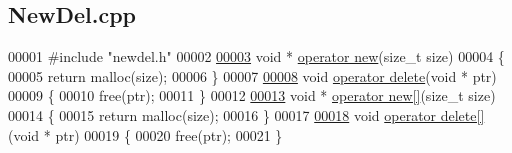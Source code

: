 \hypertarget{_new_del_8cpp_source}{
\subsection{NewDel.cpp}
}

\begin{DoxyCode}
00001 \textcolor{preprocessor}{#include "newdel.h"}
00002 
\hypertarget{_new_del_8cpp_source_l00003}{}\hyperlink{_new_del_8cpp_a205ed048fdf5259c2e8e0cb60ee8f719}{00003} \textcolor{keywordtype}{void} * \hyperlink{_new_del_8h_a205ed048fdf5259c2e8e0cb60ee8f719}{operator new}(\textcolor{keywordtype}{size\_t} size)
00004 \{
00005   \textcolor{keywordflow}{return} malloc(size);
00006 \}
00007 
\hypertarget{_new_del_8cpp_source_l00008}{}\hyperlink{_new_del_8cpp_a3d97a7e2a0208075b4b37328c96ed390}{00008} \textcolor{keywordtype}{void} \hyperlink{_new_del_8h_a3d97a7e2a0208075b4b37328c96ed390}{operator delete}(\textcolor{keywordtype}{void} * ptr)
00009 \{
00010   free(ptr);
00011 \} 
00012 
\hypertarget{_new_del_8cpp_source_l00013}{}\hyperlink{_new_del_8cpp_a63ce4f64887b9307317aee5baae6b18f}{00013} \textcolor{keywordtype}{void} * \hyperlink{_new_del_8cpp_a63ce4f64887b9307317aee5baae6b18f}{operator new[]}(\textcolor{keywordtype}{size\_t} size)
00014 \{
00015     \textcolor{keywordflow}{return} malloc(size);
00016 \}
00017 
\hypertarget{_new_del_8cpp_source_l00018}{}\hyperlink{_new_del_8cpp_a1d8b2d6f17242ae0d182b0f7a98ba54f}{00018} \textcolor{keywordtype}{void} \hyperlink{_new_del_8cpp_a1d8b2d6f17242ae0d182b0f7a98ba54f}{operator delete[]}(\textcolor{keywordtype}{void} * ptr)
00019 \{
00020     free(ptr);
00021 \} 
\end{DoxyCode}
